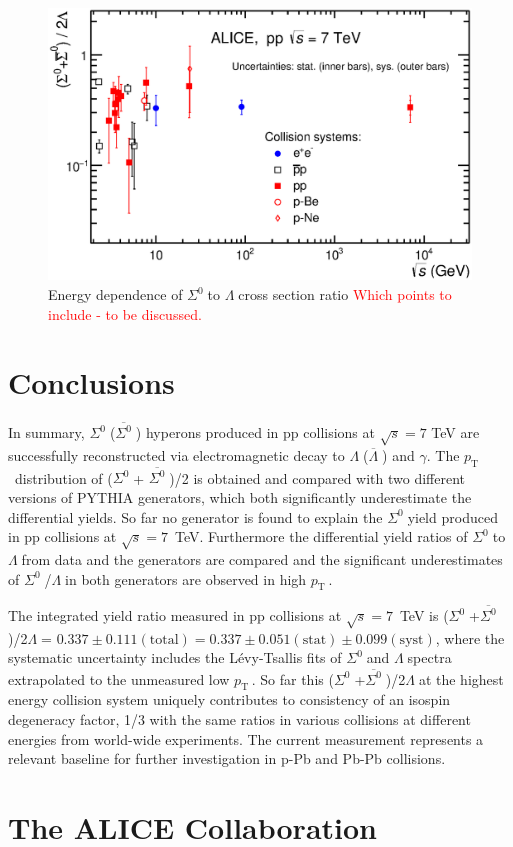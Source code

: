 \documentclass[ALICE,manyauthors]{cernphprep}
\newcommand{\sig}{\ensuremath{\Sigma^0  \; }}
\newcommand{\asig}{\ensuremath{\overline{\Sigma^0} \; }}
\newcommand{\lam}{\ensuremath{\Lambda \; }}
\newcommand{\alam}{\ensuremath{\overline{\Lambda} \; }}
\newcommand{\pt}{\ensuremath{p_{\mathrm{T}\; }}}
\newcommand{\red}{\textcolor{red}}
\begin{document}
\begin{figure}[h!]
 \centering

 \includegraphics[width=15.0cm]{Figure/2017nov1-Sigma0-LambdaRatio-WorldData.eps}

  \caption{Energy dependence of \sig to \lam  cross section ratio
 \red{ Which points to include - to be discussed.}  }
  \label{fig:SigLam-WorldData}
\end{figure}

 \section{Conclusions}
 \label{sec:conclusion}

In summary, \sig (\asig) hyperons produced in pp collisions at $\sqrt{s} = 7 $ TeV are successfully reconstructed  
via electromagnetic decay to \lam (\alam) and $\gamma$. The \pt~distribution of (\sig + \asig)/2 is obtained
and compared with two different versions of PYTHIA generators, which both significantly underestimate the differential yields. 
So far no generator is found to explain the \sig yield produced in pp collisions at $\sqrt{s} = 7$~TeV.
Furthermore the differential yield ratios of \sig to \lam from data and the generators are compared and
the significant underestimates of \sig/\lam in both generators are observed in high \pt. 

The integrated yield ratio measured in pp collisions at $\sqrt{s} = 7$~TeV is (\sig+\asig)/2\lam=
$0.337  \pm 0.111(\mathrm{total}) = 0.337   \pm 0.051(\mathrm{stat})  \pm 0.099 (\mathrm{syst})$, 
where the systematic uncertainty includes the L\'{e}vy-Tsallis fits of \sig and \lam spectra extrapolated to the unmeasured low \pt.
So far this (\sig+\asig)/2\lam at the highest energy collision system uniquely contributes to consistency of an isospin degeneracy 
factor, 1/3 with the same ratios in various collisions at different energies from world-wide experiments. The current 
measurement represents a relevant baseline for further investigation in p-Pb and Pb-Pb collisions. 

 \newpage
{}


\newpage
\appendix
\section{The ALICE Collaboration}
\label{app:collab}
\end{document}
